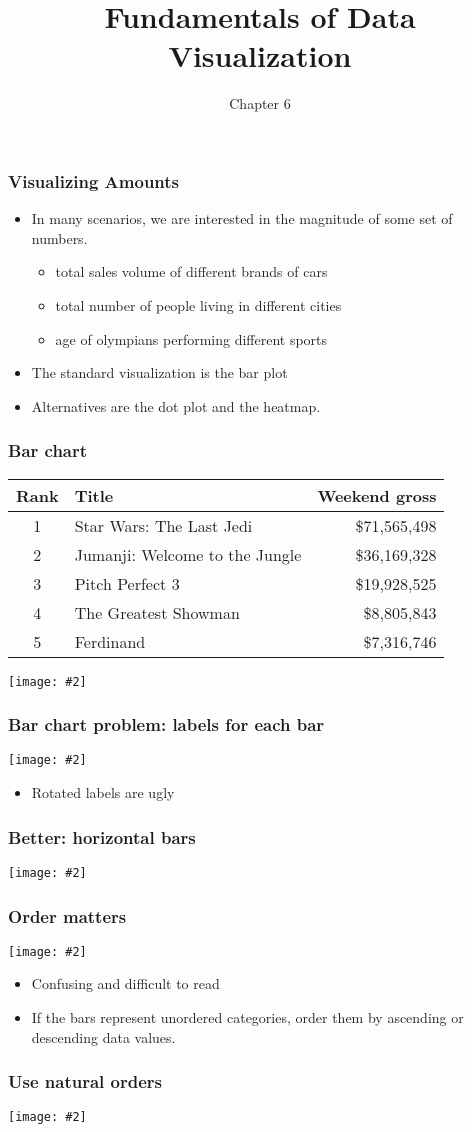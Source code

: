 \documentclass{beamer}
\title{Fundamentals of Data Visualization}
\author{Chapter 6}
\newcommand{\bi}{\begin{itemize}}
\newcommand{\li}{\item}
\newcommand{\ei}{\end{itemize}}
\newcommand{\fig}[2]{\centerline{\texttt{[image: \#2]}}}
\newcommand{\bfr}[1]{\begin{frame}[fragile]\frametitle{{ #1 }}}
\begin{document}
\begin{frame}
\maketitle
\end{frame}

\bfr{Visualizing Amounts}
\bi
\li In many scenarios, we are interested in the magnitude of some set of numbers.
  \bi
  \li total sales volume of different brands of cars
  \li total number of people living in different cities
  \li age of olympians performing different sports
  \ei
\li The standard visualization is the bar plot
\li Alternatives are the dot plot and the heatmap.
\ei

\end{frame}

\bfr{Bar chart}
\small
\begin{center}
\begin{tabular}{clr}
Rank & Title & Weekend gross \\\hline
1	&Star Wars: The Last Jedi&	\$71,565,498		\\
2	&Jumanji: Welcome to the Jungle	&\$36,169,328		\\
3	&Pitch Perfect 3	&\$19,928,525		\\
4	&The Greatest Showman&	\$8,805,843		\\
5&	Ferdinand	&\$7,316,746	
\end{tabular}
\end{center}
\fig{.8}{boxoffice-vertical-1.png}
\end{frame}

\bfr{Bar chart problem: labels for each bar}
\fig{.8}{boxoffice-rot-axis-tick-labels-1.png}
\bi
\li Rotated labels are ugly
\ei
\end{frame}

\bfr{Better: horizontal bars}
\fig{1}{boxoffice-horizontal-1.png}
\end{frame}

\bfr{Order matters}

\fig{.9}{boxoffice-horizontal-bad-order-1}
\bi
\li Confusing and difficult to read
\li  If the bars represent unordered categories, order them by ascending or descending data values.
\ei
\end{frame}

\bfr{Use natural orders}

\fig{1}{income-by-age-1.png} 

\end{frame}
\end{document}
